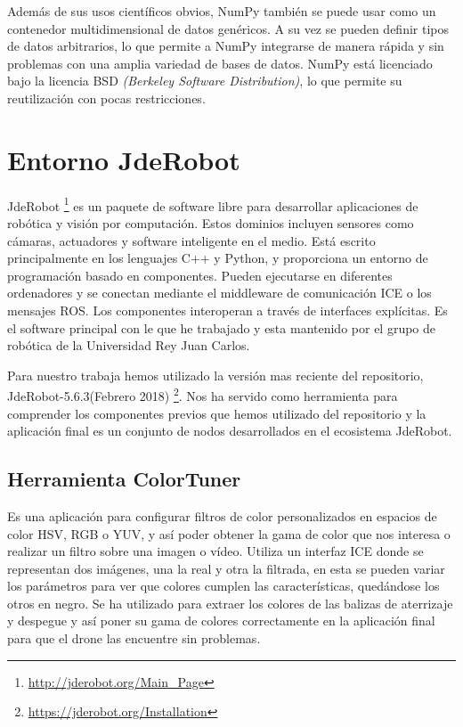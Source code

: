 \hspace{1cm} Además de sus usos científicos obvios, NumPy también se puede usar como un contenedor multidimensional de datos genéricos. A su vez se pueden definir tipos de datos arbitrarios, lo que permite a NumPy integrarse de manera rápida y sin problemas con una amplia variedad de bases de datos. NumPy está licenciado bajo la licencia BSD \textit{(Berkeley Software Distribution)}, lo que permite su reutilización con pocas restricciones.

\section{Entorno JdeRobot}
\hspace{1cm} JdeRobot \footnote{\url{http://jderobot.org/Main_Page}} es un paquete de software libre para desarrollar aplicaciones de robótica y visión por computación. Estos dominios incluyen sensores como cámaras, actuadores y software inteligente en el medio. Está escrito principalmente en los lenguajes C++ y Python, y proporciona un entorno de programación basado en componentes. Pueden ejecutarse en diferentes ordenadores y se conectan mediante el middleware de comunicación ICE o los mensajes ROS. Los componentes interoperan a través de interfaces explícitas. Es el software principal con le que he trabajado y esta mantenido por el grupo de robótica de la Universidad Rey Juan Carlos.

\hspace{1cm} Para nuestro trabaja hemos utilizado la versión mas reciente del repositorio, JdeRobot-5.6.3(Febrero 2018) \footnote{\url{https://jderobot.org/Installation}}. Nos ha servido como herramienta para comprender los componentes previos que hemos utilizado del repositorio y la aplicación final es un conjunto de nodos desarrollados en el ecosistema JdeRobot.

\subsection{Herramienta ColorTuner}
\hspace{1cm} Es una aplicación para configurar filtros de color personalizados en espacios de color HSV, RGB o YUV, y así poder obtener la gama de color que nos interesa o realizar un filtro sobre una imagen o vídeo. Utiliza un interfaz ICE donde se representan dos imágenes, una la real y otra la filtrada, en esta se pueden variar los parámetros para ver que colores cumplen las características, quedándose los otros en negro. Se ha utilizado para extraer los colores de las balizas de aterrizaje y despegue y así poner su gama de colores correctamente en la aplicación final para que el drone las encuentre sin problemas.

